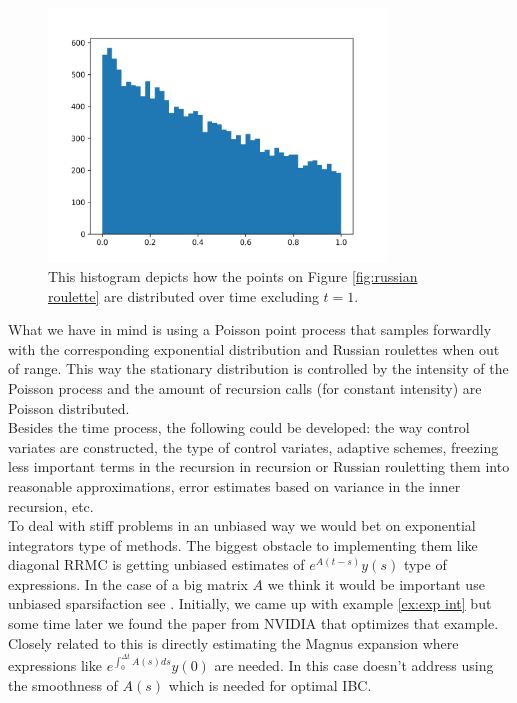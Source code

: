 \documentclass[a4paper,12pt]{article}
\begin{document}
\begin{figure}[h!]
    \centering
    \includegraphics[width=0.8\textwidth]{plots/time proces.png}
    \caption{This histogram depicts how the points
        on Figure \ref{fig:russian roulette} are distributed over time
        excluding $t=1$.}
    \label{fig:time proces}
\end{figure}

What we have in mind is using a Poisson point process
that samples forwardly with the corresponding exponential distribution and
Russian roulettes when out of range. This way the stationary distribution
is controlled by the intensity of the Poisson process and the amount
of recursion calls (for constant intensity) are Poisson distributed.\\

Besides the time process, the following could be developed: the way control
variates are constructed, the type of control variates, adaptive schemes,
freezing less important terms in the recursion in recursion or Russian rouletting
them into reasonable approximations, error estimates based on variance in the
inner recursion, etc. \\

To deal with stiff problems in an unbiased way we would bet on exponential integrators
type of methods. The biggest obstacle to implementing them like diagonal RRMC is getting
unbiased estimates of $e^{A(t-s)} y(s)$ type of expressions. In the case
of a big matrix $A$ we think it would be important use unbiased sparsifaction
see \cite{sabelfeld_sparsified_2009}.
Initially, we came
up with example \ref{ex:exp int} but some time later we found
the paper from NVIDIA \cite{kettunen_unbiased_2021} that optimizes that example.
Closely related to this is directly estimating the Magnus expansion
where expressions like $e^{\int_{0}^{\Delta t} A(s)ds}  y(0)$ are needed. In this
case \cite{kettunen_unbiased_2021} doesn't address using the smoothness
of $A(s)$ which is needed for optimal IBC. \\
\end{document}
